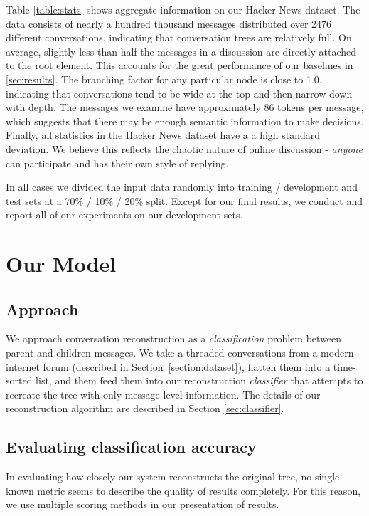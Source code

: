 \documentclass{article}
\begin{document}
Table \ref{table:stats} shows aggregate information on our Hacker News
dataset. The data consists of nearly a hundred thousand messages distributed
over 2476 different conversations, indicating that conversation trees 
are relatively full. On average, slightly less than half the messages
in a discussion are directly attached to the root element. This accounts
for the great performance of our baselines in \ref{sec:results}. 
The branching factor for any particular node is close to 1.0, indicating
that conversations tend to be wide at the top and then narrow down with
depth. The messages we examine have approximately 86 tokens per message,
which suggests that there may be enough semantic information to make
decisions. Finally, all statistics in the Hacker News dataset have a
a high standard deviation. We believe this reflects the chaotic nature of
online discussion - \textit{anyone} can participate and has their own
style of replying.

In all cases we divided the input data randomly into training / development
and test sets at a 70\% / 10\% / 20\% split. Except for our final results, we
conduct and report all of our experiments on our development sets.

\section{Our Model}
\subsection{Approach}
\label{sec:approach}
We approach conversation reconstruction as a \textit{classification} problem
between parent and children messages. We take a threaded conversations from a
modern internet forum (described in Section~\ref{section:dataset}), flatten
them into a time-sorted list, and them feed them into our reconstruction
\textit{classifier} that attempts to recreate the tree with only message-level
information. The details of our reconstruction algorithm are described in
Section \ref{sec:classifier}.

\subsection{Evaluating classification accuracy}
\label{sec:evaluation}
In evaluating how closely our system reconstructs the original tree, no single
known metric seems to describe the quality of results completely. For this reason,
we use multiple scoring methods in our presentation of results.
\end{document}
